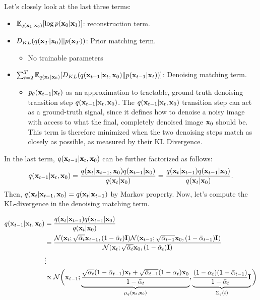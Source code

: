 Let's closely look at the last three terms:
\begin{itemize}
	\item $\mathbb{E}_{q({\mathbf{x}}_{1}|{\mathbf{x}}_0)}[\log p({\mathbf{x}}_0|{\mathbf{x}}_{1})]$: reconstruction term. 
	\item $D_{KL} (q({\mathbf{x}}_{T}|{\mathbf{x}}_0)||p({\mathbf{x}}_T))$: Prior matching term.
		\begin{itemize}
			\item No trainable parameters 
		\end{itemize}
	\item $\sum_{t=2}^{T}\mathbb{E}_{q({\mathbf{x}}_{t}|{\mathbf{x}}_0)}[D_{KL}(q({\mathbf{x}}_{t-1}|{\mathbf{x}}_t, {\mathbf{x}}_0)\|p({\mathbf{x}}_{t-1}|{\mathbf{x}}_{t}))]$: Denoising matching term.
		\begin{itemize}
			\item $p_\theta({\mathbf{x}}_{t-1}|{\mathbf{x}}_t)$ as an approximation to tractable, ground-truth denoising transition step $q({\mathbf{x}}_{t-1}|{\mathbf{x}}_t, {\mathbf{x}}_0)$. The $q({\mathbf{x}}_{t-1}|{\mathbf{x}}_t, {\mathbf{x}}_0)$ transition step can act as a ground-truth signal, since it defines how to denoise a noisy image with access to what the final, completely denoised image ${\mathbf{x}}_0$ should be. This term is therefore minimized when the two denoising steps match as closely as possible, as measured by their KL Divergence.
		\end{itemize}
\end{itemize}
In the last term, $q({\mathbf{x}}_{t-1}|{\mathbf{x}}_t, {\mathbf{x}}_0)$ can be further factorized as follows:
\begin{align*}
	q({\mathbf{x}}_{t-1}|{\mathbf{x}}_t, {\mathbf{x}}_0) = \frac{q({\mathbf{x}}_{t}|{\mathbf{x}}_{t-1}, {\mathbf{x}}_0)q({\mathbf{x}}_{t-1}|{\mathbf{x}}_0)}{q({\mathbf{x}}_{t}|{\mathbf{x}}_0)}=\frac{q({\mathbf{x}}_{t}|{\mathbf{x}}_{t-1})q({\mathbf{x}}_{t-1}|{\mathbf{x}}_0)}{q({\mathbf{x}}_{t}|{\mathbf{x}}_0)}.
\end{align*}
Then, $q({\mathbf{x}}_{t}|{\mathbf{x}}_{t-1}, {\mathbf{x}}_0) = q({\mathbf{x}}_{t}|{\mathbf{x}}_{t-1})$ by Markov property. Now, let's compute the KL-divergence in the denoising matching term. 

\begin{align}
	q({\mathbf{x}}_{t-1}|{\mathbf{x}}_t, {\mathbf{x}}_0) &=\frac{q({\mathbf{x}}_{t}|{\mathbf{x}}_{t-1})q({\mathbf{x}}_{t-1}|{\mathbf{x}}_0)}{q({\mathbf{x}}_{t}|{\mathbf{x}}_0)}\\
								 &= \frac{\mathcal{N}(\mathbf{x}_t; \sqrt{\bar{\alpha}_t} {\mathbf{x}}_{t-1}, (1-\bar{\alpha}_t)\mathbf{I})\mathcal{N}(\mathbf{x}_{t-1}; \sqrt{\bar{\alpha}_{t-1}} {\mathbf{x}}_{0}, (1-\bar{\alpha}_{t-1})\mathbf{I})}{\mathcal{N}(\mathbf{x}_t; \sqrt{\bar{\alpha}_t} {\mathbf{x}}_{0}, (1-\bar{\alpha}_t)\mathbf{I})}\\
								 & \vdots\\
								 &\propto \mathcal{N}\bigg({\mathbf{x}}_{t-1};\underbrace{\frac{\sqrt{{\alpha}_{t}}(1-\bar{\alpha}_{t-1}){\mathbf{x}}_t+\sqrt{\bar{\alpha}_{t-1}}(1-{\alpha}_{t}){\mathbf{x}}_0}{1-\bar{\alpha}_{t}}}_{\mu_q({\mathbf{x}}_t,{\mathbf{x}}_0)}, \underbrace{\frac{(1-{\alpha}_{t})(1-\bar{\alpha}_{t-1})}{1-\bar{\alpha}_{t}}\mathbf{I}}_{\Sigma_{q}(t)}\bigg)
	\label{eq:diffusion_kl_true_denoising}
\end{align}


